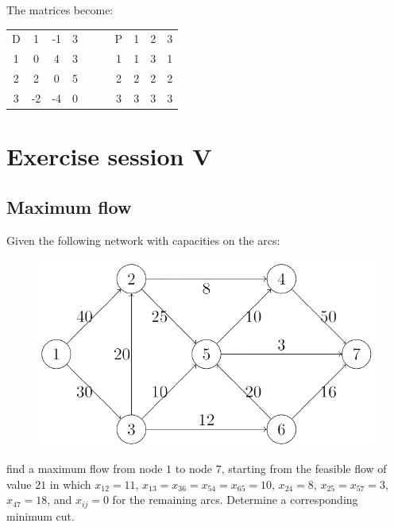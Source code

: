 \documentclass[12pt, a4paper]{report}
\begin{document}
\begin{enumerate}
                The matrices become: 
                \begin{table}[H]
                    \centering
                    \begin{tabular}{c|ccccc|ccc}
                    D & 1        & -1       & 3          & $\:\:\:\:\:\:$ & P & 1 & 2 & 3  \\ \cline{1-4} \cline{6-9} 
                    1 & 0        & 4        & 3          &                & 1 & 1 & 3 & 1  \\
                    2 & 2        & 0        & 5          &                & 2 & 2 & 2 & 2  \\
                    3 & -2       & -4       & 0          &                & 3 & 3 & 3 & 3  \\ 
                    \end{tabular}
                \end{table}
        \end{enumerate}

\newpage

\chapter{Exercise session V}
    \section{Maximum flow}
        Given the following network with capacities on the arcs: 
        \begin{figure}[H]
            \centering
            \includegraphics[width=0.5\linewidth]{images/maxfl.png}
        \end{figure}
        find a maximum flow from node $1$ to node $7$, starting from the feasible flow of value $21$ in which $x_{12} = 11$, $x_{13} = x_{36} = x_{54} = x_{65} = 10$, $x_{24} = 8$, $x_{25} = x_{57} = 3$, 
        $x_{47} = 18$, and $x_{ij} = 0$ for the remaining arcs. Determine a corresponding minimum cut.
\end{document}
